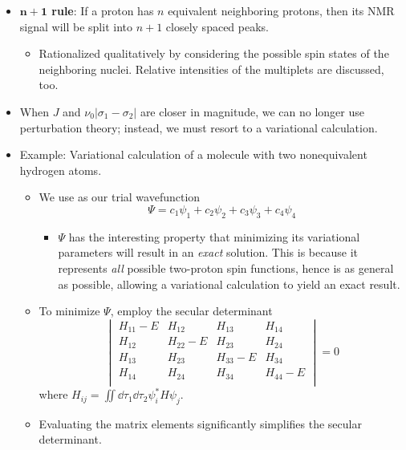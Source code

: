 \documentclass[../notes.tex]{subfiles}
\begin{document}
\begin{itemize}
    \item \textbf{$\bm{n+1}$ rule}: If a proton has $n$ equivalent neighboring protons, then its NMR signal will be split into $n+1$ closely spaced peaks.
    \begin{itemize}
        \item Rationalized qualitatively by considering the possible spin states of the neighboring nuclei. Relative intensities of the multiplets are discussed, too.
    \end{itemize}
    \item When $J$ and $\nu_0|\sigma_1-\sigma_2|$ are closer in magnitude, we can no longer use perturbation theory; instead, we must resort to a variational calculation.
    \item Example: Variational calculation of a molecule with two nonequivalent hydrogen atoms.
    \begin{itemize}
        \item We use as our trial wavefunction
        \begin{equation*}
            \Psi = c_1\psi_1+c_2\psi_2+c_3\psi_3+c_4\psi_4
        \end{equation*}
        \begin{itemize}
            \item $\Psi$ has the interesting property that minimizing its variational parameters will result in an \emph{exact} solution. This is because it represents \emph{all} possible two-proton spin functions, hence is as general as possible, allowing a variational calculation to yield an exact result.
        \end{itemize}
        \item To minimize $\Psi$, employ the secular determinant
        \begin{equation*}
            \begin{vmatrix}
                H_{11}-E & H_{12} & H_{13} & H_{14}\\
                H_{12} & H_{22}-E & H_{23} & H_{24}\\
                H_{13} & H_{23} & H_{33}-E & H_{34}\\
                H_{14} & H_{24} & H_{34} & H_{44}-E\\
            \end{vmatrix}
            = 0
        \end{equation*}
        where $H_{ij}=\iint\dd{\tau_1}\dd{\tau_2}\psi_i^*\hat{H}\psi_j$.
        \item Evaluating the matrix elements significantly simplifies the secular determinant.

\end{itemize}
\end{itemize}
\end{document}
